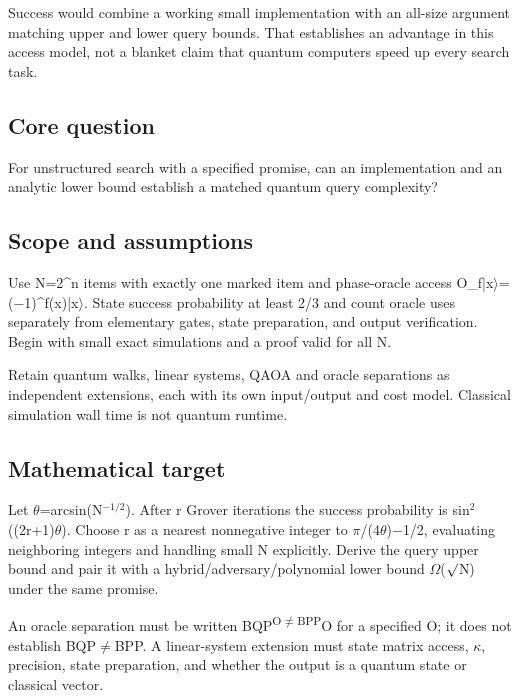 \documentclass[
  11pt,
]{article}
\begin{document}
Success would combine a working small implementation with an all-size
argument matching upper and lower query bounds. That establishes an
advantage in this access model, not a blanket claim that quantum
computers speed up every search task.

\subsection{Core question}

For unstructured search with a specified promise, can an implementation
and an analytic lower bound establish a matched quantum query
complexity?

\subsection{Scope and assumptions}

Use N=2\^{}n items with exactly one marked item and phase-oracle access
O\_f|x\ensuremath{\rangle}=(\ensuremath{-}1)\textasciicircum{}f(x)|x\ensuremath{\rangle}.
State success probability at least 2/3 and count oracle uses separately
from elementary gates, state preparation, and output verification. Begin
with small exact simulations and a proof valid for all N.

Retain quantum walks, linear systems, QAOA and oracle separations as
independent extensions, each with its own input/output and cost model.
Classical simulation wall time is not quantum runtime.

\subsection{Mathematical target}

Let \ensuremath{\theta}=arcsin(N\ensuremath{{}^{-1/2}}). After r Grover
iterations the success probability is
sin\ensuremath{{}^{2}}((2r+1)\ensuremath{\theta}). Choose r as a nearest
nonnegative integer to
\ensuremath{\pi}/(4\ensuremath{\theta})\ensuremath{-}1/2, evaluating
neighboring integers and handling small N explicitly. Derive the query
upper bound and pair it with a hybrid/adversary/polynomial lower bound
\ensuremath{\Omega}(\ensuremath{\surd}N) under the same promise.

An oracle separation must be written
BQP\textsuperscript{O\ensuremath{\ne}BPP}O for a specified O; it does
not establish BQP\ensuremath{\ne}BPP. A linear-system extension must
state matrix access, \ensuremath{\kappa}, precision, state preparation,
and whether the output is a quantum state or classical vector.
\end{document}
